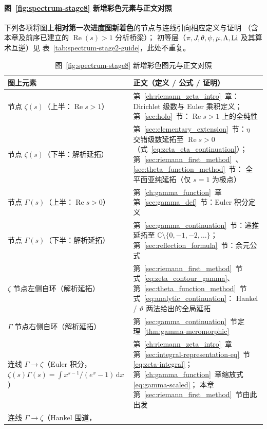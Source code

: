 \paragraph{图~\ref{fig:spectrum-stage8} 新增彩色元素与正文对照}
下列各项将图上\textbf{相对第一次进度图新着色}的节点与连线引向相应定义与证明
（含本章及前序已建立的 $\operatorname{Re}(s)>1$ 分析桥梁）；
初等层（$\pi,J,\theta,\psi,\mu,\Lambda,\operatorname{Li}$ 及其算术互逆）见
表~\ref{tab:spectrum-stage2-guide}，此处不重复。
\begin{table}[htbp]
\centering
\caption{图~\ref{fig:spectrum-stage8} 新增彩色图元与正文对照}
\label{tab:spectrum-stage8-guide}
\small
\renewcommand{\arraystretch}{1.35}
\begin{tabular}{@{}p{4.9cm}p{8.3cm}@{}}
\toprule
\textbf{图上元素} & \textbf{正文（定义 / 公式 / 证明）} \\
\midrule
节点 $\zeta(s)$（上半：$\operatorname{Re}s>1$） &
  第~\ref{ch:riemann_zeta_intro}~章：Dirichlet 级数与 Euler 乘积定义；
  第~\ref{sec:holo}~节：$\operatorname{Re}s>1$ 上的全纯性 \\
节点 $\zeta(s)$（下半：解析延拓） &
  第~\ref{sec:elementary_extension}~节：$\eta$ 交错级数延拓至 $\operatorname{Re}s>0$
  （式~\eqref{eq:zeta_eta_continuation}）；
  第~\ref{sec:riemann_first_method}~、\ref{sec:theta_function_method}~节：
  全平面亚纯延拓（仅 $s=1$ 为极点） \\
节点 $\Gamma(s)$（上半：$\operatorname{Re}s>0$） &
  第~\ref{ch:gamma_function}~章第~\ref{sec:gamma_def}~节：Euler 积分定义 \\
节点 $\Gamma(s)$（下半：解析延拓） &
  第~\ref{sec:gamma_continuation}~节：递推延拓至 $\mathbb{C}\setminus\{0,-1,-2,\ldots\}$；
  第~\ref{sec:reflection_formula}~节：余元公式 \\
$\zeta$ 节点左侧自环（解析延拓） &
  第~\ref{sec:riemann_first_method}~节式~\eqref{eq:zeta_contour_gamma}、
  第~\ref{sec:theta_function_method}~节式~\eqref{eq:analytic_continuation}：
  Hankel / $\vartheta$ 两法给出的全局延拓 \\
$\Gamma$ 节点右侧自环（解析延拓） &
  第~\ref{sec:gamma_continuation}~节定理~\ref{thm:gamma-meromorphic} \\
连线 $\Gamma\to\zeta$（Euler 积分，
  $\zeta(s)\Gamma(s)=\int x^{s-1}/(e^x-1)\,\mathrm{d}x$） &
  第~\ref{ch:riemann_zeta_intro}~章第~\ref{sec:integral-representation-eq}~节\eqref{eq:zeta-integral}；
  第~\ref{ch:gamma_function}~章缩放式\eqref{eq:gamma-scaled}；
  本章第~\ref{sec:riemann_first_method}~节由此出发 \\
连线 $\Gamma\to\zeta$（Hankel 围道，

\end{tabular}
\end{table}
